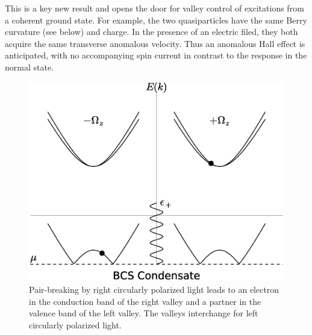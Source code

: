This is a key new result and opens the door for valley control of excitations
from a coherent ground state.
For example, the two quasiparticles have the same Berry curvature
(see below) and charge.
In the presence of an electric filed,
they both acquire the same transverse anomalous velocity.
Thus an anomalous Hall effect is anticipated,
with no accompanying spin current
in contrast to the response in the normal state.

\begin{figure}
  \includegraphics[width=\columnwidth]{figures/bcs-excitation}
  \caption{%
    Pair-breaking by right circularly polarized light
    leads to an electron in the conduction band of the right valley
    and a partner in the valence band of the left valley.
    The valleys interchange for left circularly polarized light.
  }\label{fig:optical-excitation}
\end{figure}
